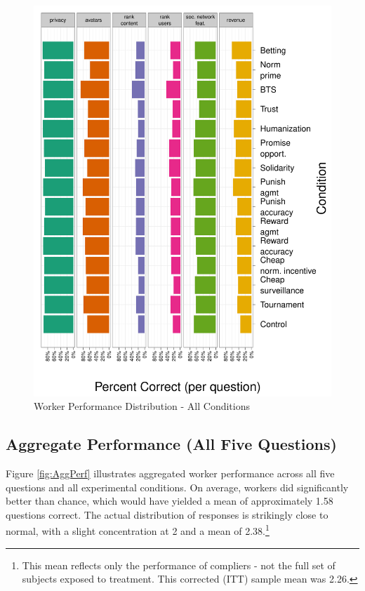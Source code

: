 \documentclass{chi2009}
\begin{document}
\begin{figure} 
\centering 
\caption{Worker Performance Distribution - All Conditions \label{fig:per_q}}
\includegraphics[scale=.35]{../images/per_q}
\end{figure} 

\subsection{Aggregate Performance (All Five Questions)}

Figure \ref{fig:AggPerf} illustrates aggregated worker performance
across all five questions and all experimental conditions. On average,
workers did significantly better than chance, which would have yielded
a mean of approximately 1.58 questions correct.  The actual
distribution of responses is strikingly close to normal, with a slight
concentration at 2 and a mean of 2.38.\footnote{This mean reflects
  only the performance of compliers - not the full set of subjects
  exposed to treatment. This corrected (ITT) sample mean was 2.26.}
\end{document}
